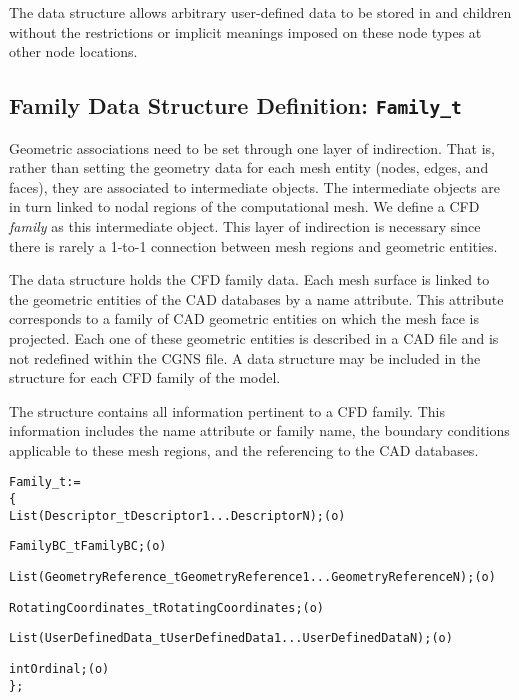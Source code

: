 The  data structure allows arbitrary
user-defined data to be stored in  and
 children without the restrictions or implicit
meanings imposed on these node types at other node locations.

\subsection{Family Data Structure Definition: \texttt{Family\_t}}
\label{s:Family}

Geometric associations need to be set through one layer of indirection.
That is, rather than setting the geometry data for each mesh entity
(nodes, edges, and faces), they are associated to intermediate objects.
The intermediate objects are in turn linked to nodal regions of the
computational mesh.
We define a CFD \emph{family} as this intermediate object.
This layer of indirection is necessary since there is rarely a 1-to-1
connection between mesh regions and geometric entities.

The  data structure holds the CFD family data.
Each mesh surface is linked to the geometric entities of the CAD databases
by a name attribute.
This attribute corresponds to a family of CAD geometric entities on which
the mesh face is projected.
Each one of these geometric entities is described in a CAD file and is not
redefined within the CGNS file.
A  data structure may be included in the 
structure for each CFD family of the model.

The  structure contains all information pertinent to a
CFD family.
This information includes the name attribute or family name, the
boundary conditions applicable to these mesh regions, and the referencing
to the CAD databases.

\begin{alltt}
  Family\_t :=
    \{
    List( Descriptor\_t Descriptor1 ... DescriptorN ) ;                      (o)

    FamilyBC\_t FamilyBC ;                                                   (o)

    List( GeometryReference\_t GeometryReference1 ... GeometryReferenceN ) ; (o)

    RotatingCoordinates\_t RotatingCoordinates ;                             (o)

    List( UserDefinedData\_t UserDefinedData1 ... UserDefinedDataN ) ;       (o)

    int Ordinal ;                                                           (o)
    \} ;
\end{alltt}

